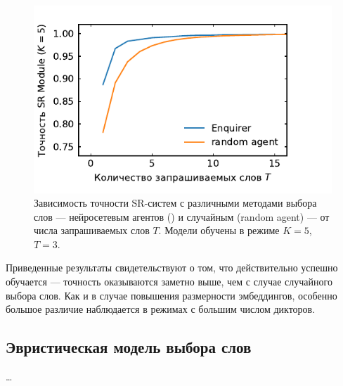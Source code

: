 \begin{figure}[htb]
    \centering
    \includegraphics[scale=1.0]{../plots/word_sweep_enq.pdf}
    \caption{Зависимость точности SR-систем с различными методами выбора слов
    --- нейросетевым агентов (\enquirer{}) и случайным (random agent) --- от
    числа запрашиваемых слов $T$. Модели обучены в режиме $K = 5$, $T = 3$.}
\end{figure}

Приведенные результаты свидетельствуют о том, что \enquirer{} действительно
успешно обучается --- точность оказываются заметно выше, чем с случае
случайного выбора слов. Как и в случае повышения размерности эмбеддингов,
особенно большое различие наблюдается в режимах с большим числом дикторов.

\subsection{Эвристическая модель выбора слов}

\ldots